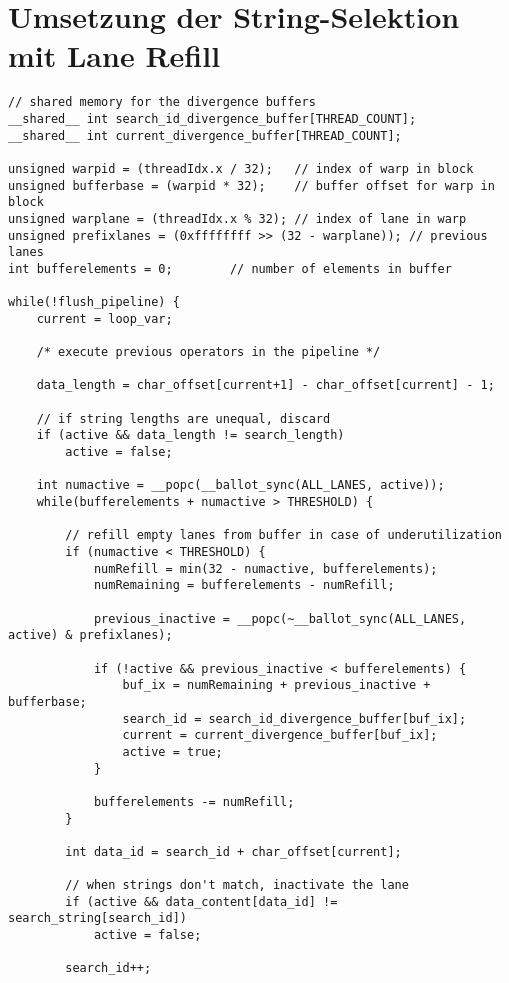 \chapter{Umsetzung der String-Selektion mit Lane Refill}
\label{apx:equals_lane_refill}

\begin{lstlisting}[language=MyC++,
caption=Umsetzung der String-Selektion mit Lane Refill]
// shared memory for the divergence buffers
__shared__ int search_id_divergence_buffer[THREAD_COUNT];
__shared__ int current_divergence_buffer[THREAD_COUNT];

unsigned warpid = (threadIdx.x / 32);	// index of warp in block
unsigned bufferbase = (warpid * 32);    // buffer offset for warp in block
unsigned warplane = (threadIdx.x % 32); // index of lane in warp
unsigned prefixlanes = (0xffffffff >> (32 - warplane)); // previous lanes
int bufferelements = 0;        // number of elements in buffer

while(!flush_pipeline) {
	current = loop_var;
	
	/* execute previous operators in the pipeline */
	
	data_length = char_offset[current+1] - char_offset[current] - 1;
	
	// if string lengths are unequal, discard
	if (active && data_length != search_length)
		active = false;
	
	int numactive = __popc(__ballot_sync(ALL_LANES, active));
	while(bufferelements + numactive > THRESHOLD) {
	
		// refill empty lanes from buffer in case of underutilization
		if (numactive < THRESHOLD) {
			numRefill = min(32 - numactive, bufferelements);
			numRemaining = bufferelements - numRefill;
			
			previous_inactive = __popc(~__ballot_sync(ALL_LANES, active) & prefixlanes);
			
			if (!active && previous_inactive < bufferelements) {
				buf_ix = numRemaining + previous_inactive + bufferbase;
				search_id = search_id_divergence_buffer[buf_ix];
				current = current_divergence_buffer[buf_ix];
				active = true;
			}
			
			bufferelements -= numRefill;
		}
	
		int data_id = search_id + char_offset[current];
		
		// when strings don't match, inactivate the lane
		if (active && data_content[data_id] != search_string[search_id])
			active = false;
		
		search_id++;
		

\end{lstlisting}
